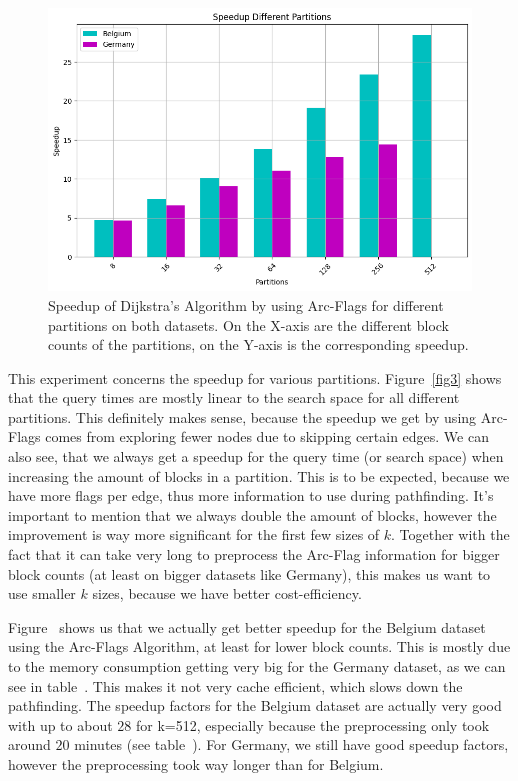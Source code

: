 \documentclass[acmsmall,nonacm,screen,review]{acmart}
\begin{document}
\begin{figure}[bt!]
    \centering
    \includegraphics[width=0.6\linewidth]{combinedSpeedup.png}
    \caption{Speedup of Dijkstra's Algorithm by using Arc-Flags for different partitions on both datasets.
    On the X-axis are the different block counts of the partitions, on the Y-axis is the corresponding speedup.}
    \label{fig4}
\end{figure}

This experiment concerns the speedup for various partitions.
Figure~\ref{fig3} shows that the query times are mostly linear to the search space for all different partitions. This definitely makes sense, 
because the speedup we get by using Arc-Flags comes from exploring fewer nodes due to skipping certain edges. We can also see, that we always get a
speedup for the query time (or search space) when increasing the amount of blocks in a partition.
This is to be expected, because we have more flags per edge, thus more information to use during pathfinding.
It's important to mention that we always double the amount of blocks, however the improvement is way more significant for the first few sizes of $k$. Together
with the fact that it can take very long to preprocess the Arc-Flag information for bigger block counts (at least on bigger datasets like Germany), this makes
us want to use smaller $k$ sizes, because we have better cost-efficiency.

Figure~ shows us that we actually get better speedup for the Belgium dataset using the Arc-Flags Algorithm, at least for lower block counts.
This is mostly due to the memory consumption getting very big for the Germany dataset, as we can see in table~.
This makes it not very cache efficient, which slows down the pathfinding.
The speedup factors for the Belgium dataset are actually very good with up to about $28$ for k=512, especially because the preprocessing only
took around $20$ minutes (see table~). For Germany, we still have good speedup factors,
however the preprocessing took way longer than for Belgium.
\end{document}
